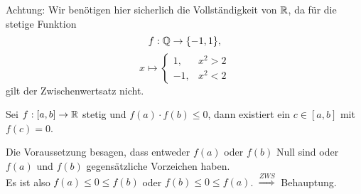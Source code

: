 \documentclass[../ana1.tex]{subfiles}
\begin{document}
Achtung: Wir benötigen hier sicherlich die Vollständigkeit von 
\( \mathbb{R} \), da für die stetige Funktion 
\[ f: \mathbb{Q} \rightarrow \{-1, 1\}, \]
\[ x \mapsto \begin{cases}
    1, &x^2 > 2 \\
    -1, &x^2 < 2
\end{cases} \]
gilt der Zwischenwertsatz nicht.
\begin{kor}
    Sei \( f: [a,b] \rightarrow \mathbb{R} \) stetig und 
    \( f(a) \cdot f(b) \leq 0 \), dann existiert 
    ein \( c \in [a,b] \) mit \( f(c) = 0 \).
\end{kor}
\begin{bew}
    Die Voraussetzung besagen, dass entweder 
    \( f(a) \) oder \( f(b) \) Null sind oder 
    \( f(a) \) und \( f(b) \) gegensätzliche 
    Vorzeichen haben.\\
    Es ist also \( f(a) \leq 0 \leq f(b) \) 
    oder \( f(b) \leq 0 \leq f(a) \).
    \( \overset{ZWS}{\Rightarrow} \) Behauptung.
\end{bew}
\end{document}
